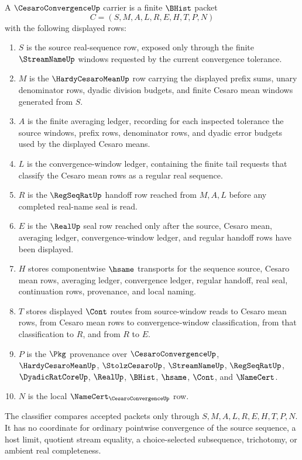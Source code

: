 \begin{definition}\label{def:cesaro-convergence-carrier}
A $\CesaroConvergenceUp$ carrier is a finite $\BHist$ packet
$$
C=(S,M,A,L,R,E,H,T,P,N)
$$
with the following displayed rows:
\begin{enumerate}
\item $S$ is the source real-sequence row, exposed only through the finite $\StreamNameUp$ windows requested by the current convergence tolerance.
\item $M$ is the $\HardyCesaroMeanUp$ row carrying the displayed prefix sums, unary denominator rows, dyadic division budgets, and finite Cesaro mean windows generated from $S$.
\item $A$ is the finite averaging ledger, recording for each inspected tolerance the source windows, prefix rows, denominator rows, and dyadic error budgets used by the displayed Cesaro means.
\item $L$ is the convergence-window ledger, containing the finite tail requests that classify the Cesaro mean rows as a regular real sequence.
\item $R$ is the $\RegSeqRatUp$ handoff row reached from $M,A,L$ before any completed real-name seal is read.
\item $E$ is the $\RealUp$ seal row reached only after the source, Cesaro mean, averaging ledger, convergence-window ledger, and regular handoff rows have been displayed.
\item $H$ stores componentwise $\hsame$ transports for the sequence source, Cesaro mean rows, averaging ledger, convergence ledger, regular handoff, real seal, continuation rows, provenance, and local naming.
\item $T$ stores displayed $\Cont$ routes from source-window reads to Cesaro mean rows, from Cesaro mean rows to convergence-window classification, from that classification to $R$, and from $R$ to $E$.
\item $P$ is the $\Pkg$ provenance over $\CesaroConvergenceUp$, $\HardyCesaroMeanUp$, $\StolzCesaroUp$, $\StreamNameUp$, $\RegSeqRatUp$, $\DyadicRatCoreUp$, $\RealUp$, $\BHist$, $\hsame$, $\Cont$, and $\NameCert$.
\item $N$ is the local $\NameCert_{\CesaroConvergenceUp}$ row.
\end{enumerate}
The classifier compares accepted packets only through $S,M,A,L,R,E,H,T,P,N$. It has no coordinate for ordinary pointwise convergence of the source sequence, a host limit, quotient stream equality, a choice-selected subsequence, trichotomy, or ambient real completeness.
\end{definition}

